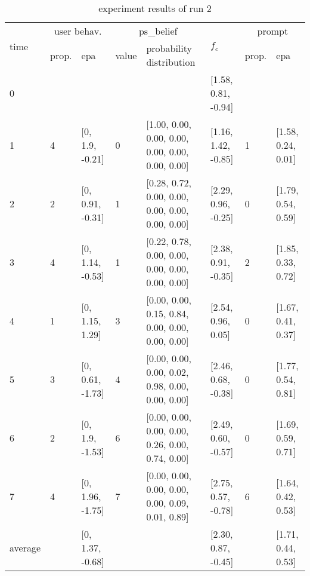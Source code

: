 \begin{table}[htbp]\footnotesize
\caption{experiment results of run 2}
\begin{tabular}{|p{0.4cm}|p{0.6cm}|l|p{0.6cm}|p{3.3cm}|l|p{0.6cm}|l|}
\hline

\multirow{2}{*}{time} & \multicolumn{2}{c|}{user behav.} & \multicolumn{2}{c|}{ps\_belief} &
\multirow{2}{*}{$f_c$} & \multicolumn{2}{c|}{prompt} \\ \cline{2-5}\cline{ 7- 8}
& prop. & epa & value & probability distribution &  & prop. & epa \\ \hline

0 & \multicolumn{1}{l|}{} &  & \multicolumn{1}{l|}{} &  & [1.58, 0.81, -0.94] & \multicolumn{1}{l|}{} &  \\ \hline
1 & 4 & [0, 1.9, -0.21] & 0 & [1.00, 0.00, 0.00, 0.00, 0.00, 0.00, 0.00, 0.00] & [1.16, 1.42, -0.85] & 1 & [1.58, 0.24, 0.01] \\ \hline
2 & 2 & [0, 0.91, -0.31] & 1 & [0.28, 0.72, 0.00, 0.00, 0.00, 0.00, 0.00, 0.00] & [2.29, 0.96, -0.25] & 0 & [1.79, 0.54, 0.59] \\ \hline
3 & 4 & [0, 1.14, -0.53] & 1 & [0.22, 0.78, 0.00, 0.00, 0.00, 0.00, 0.00, 0.00] & [2.38, 0.91, -0.35] & 2 & [1.85, 0.33, 0.72] \\ \hline
4 & 1 & [0, 1.15, 1.29] & 3 & [0.00, 0.00, 0.15, 0.84, 0.00, 0.00, 0.00, 0.00] & [2.54, 0.96, 0.05] & 0 & [1.67, 0.41, 0.37] \\ \hline
5 & 3 & [0, 0.61, -1.73] & 4 & [0.00, 0.00, 0.00, 0.02, 0.98, 0.00, 0.00, 0.00] & [2.46, 0.68, -0.38] & 0 & [1.77, 0.54, 0.81] \\ \hline
6 & 2 & [0, 1.9, -1.53] & 6 & [0.00, 0.00, 0.00, 0.00, 0.26, 0.00, 0.74, 0.00] & [2.49, 0.60, -0.57] & 0 & [1.69, 0.59, 0.71] \\ \hline
7 & 4 & [0, 1.96, -1.75] & 7 & [0.00, 0.00, 0.00, 0.00, 0.00, 0.09, 0.01, 0.89] & [2.75, 0.57, -0.78] & 6 & [1.64, 0.42, 0.53] \\ \hline
\multicolumn{1}{|l|}{average} & \multicolumn{1}{l|}{} & [0, 1.37, -0.68] & \multicolumn{1}{l|}{} &  & [2.30, 0.87, -0.45] & \multicolumn{1}{l|}{} & [1.71, 0.44, 0.53] \\ \hline
\end{tabular}
\label{}
\end{table}


